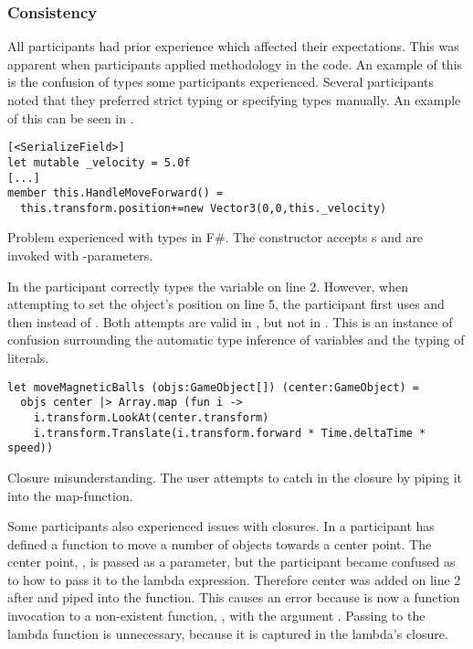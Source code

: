 \subsubsection{Consistency}\label{sec:part-cons} %
All participants had prior \cs experience which affected their expectations. This was apparent when participants applied \cs methodology in the \fs code. An example of this is the confusion of types some participants experienced. Several participants noted that they preferred strict typing or specifying types manually. An example of this can be seen in .

\begin{listing}[H]
\begin{verbatim}
[<SerializeField>]
let mutable _velocity = 5.0f
[...]
member this.HandleMoveForward() =
  this.transform.position+=new Vector3(0,0,this._velocity)
\end{verbatim}
\caption{Problem experienced with types in F\#. The  constructor accepts s and are invoked with -parameters.}
\label{lst:type-conf}
\end{listing}

In  the participant correctly types the  variable on line 2. However, when attempting to set the object's position on line 5, the participant first uses  and then  instead of . Both attempts are valid in \cs, but not in \fs. This is an instance of confusion surrounding the automatic type inference of variables and the typing of literals.

\begin{listing}[H]
\begin{verbatim}
let moveMagneticBalls (objs:GameObject[]) (center:GameObject) =
  objs center |> Array.map (fun i ->
    i.transform.LookAt(center.transform)
    i.transform.Translate(i.transform.forward * Time.deltaTime * speed))
\end{verbatim}
\caption{Closure misunderstanding. The user attempts to catch  in the closure by piping it into the map-function.}
\label{lst:clos-mis}
\end{listing}

Some participants also experienced issues with closures. In  a participant has defined a function to move a number of objects towards a center point. The center point, , is passed as a parameter, but the participant became confused as to how to pass it to the lambda expression. Therefore center was added on line 2 after  and piped into the  function. This causes an error because  is now a function invocation to a non-existent function, , with the argument . Passing  to the lambda function is unnecessary, because it is captured in the lambda's closure.

